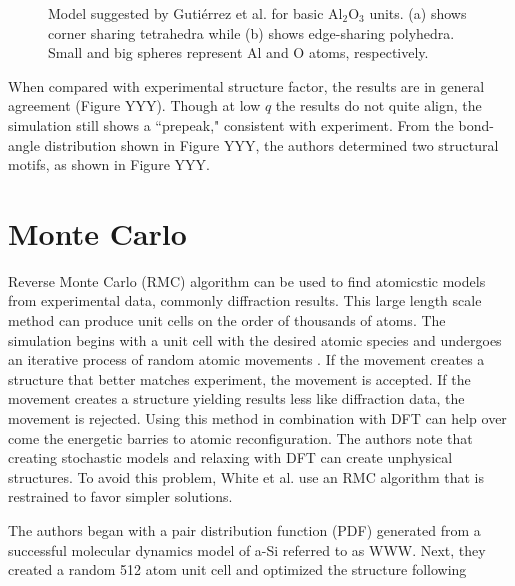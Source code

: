 \documentclass[3p,review,12pt]{elsarticle}
\begin{document}
\begin{figure}[H]
\begin{minipage}[b]{0.45\textwidth}
		\centering
		\caption{Model suggested by Guti\'errez et al. \cite{Gutierrez2002} for basic Al$_{2}$O$_{3}$ units. (a) shows corner sharing tetrahedra while (b) shows edge-sharing polyhedra. Small and big spheres represent Al and O atoms, respectively. }
	\end{minipage}
\end{figure}
\par 
When compared with experimental structure factor, the results are in general agreement (Figure YYY). Though at low $q$ the results do not quite align, the simulation still shows a ``prepeak," consistent with experiment. From the bond-angle distribution shown in Figure YYY, the authors determined two structural motifs, as shown in Figure YYY.


\section{Monte Carlo}
Reverse Monte Carlo (RMC) algorithm can be used to find atomicstic models from experimental data, commonly diffraction results. This large length scale method can produce unit cells on the order of thousands of atoms. The simulation begins with a unit cell with the desired atomic species and undergoes an iterative process of random atomic movements \cite{White2014}. If the movement creates a structure that better matches experiment, the movement is accepted. If the movement creates a structure yielding results less like diffraction data, the movement is rejected. Using this method in combination with DFT can help over come the energetic barries to atomic reconfiguration. The authors note that creating stochastic models and relaxing with DFT can create unphysical structures. To avoid this problem, White et al. \cite{White2014} use an RMC algorithm that is restrained to favor simpler solutions.
\par 
The authors began with a pair distribution function (PDF) generated from a  successful molecular dynamics model of a-Si referred to as WWW. Next, they created a random 512 atom unit cell and optimized the structure following
\end{document}
